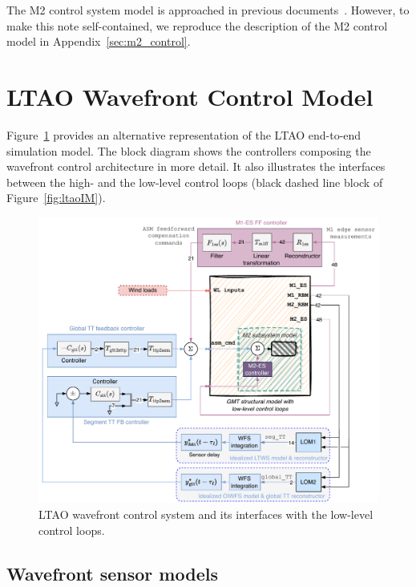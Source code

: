 \documentclass{gmto}
\begin{document}
%
The M2 control system model is approached in previous documents~\cite{GMT.DOC.05553, GMT.DOC.05941}. However, to make this note self-contained, we reproduce the description of the M2 control model in Appendix~\ref{sec:m2_control}.



\section{LTAO Wavefront Control Model}

Figure~\ref{fig:ltao_wfsc_detailed} provides an alternative representation of the LTAO end-to-end simulation model. The block diagram shows the controllers composing the wavefront control architecture in more detail. It also illustrates the interfaces between the high- and the low-level control loops (black dashed line block of Figure~\ref{fig:ltaoIM}).
%
\begin{figure}[!ht]
    \centering
    \includegraphics[width=\textwidth]{../ltao_e2e-detailed_wfsc.pdf}
    \caption[LTAO wavefront control model]{LTAO wavefront control system and its interfaces with the low-level control loops.}
    \label{fig:ltao_wfsc_detailed}
\end{figure}
%

\subsection{Wavefront sensor models}
\end{document}
